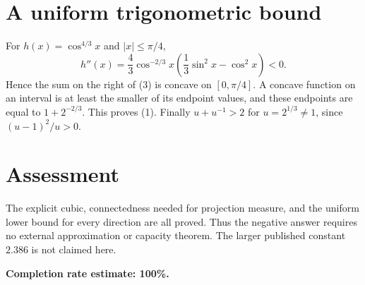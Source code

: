 \documentclass[11pt]{article}
\begin{document}
\section*{A uniform trigonometric bound}
For $h(x)=\cos^{4/3}x$ and $|x|\le\pi/4$,
\[
 h''(x)=\frac43\cos^{-2/3}x
 \left(\frac13\sin^2x-\cos^2x\right)<0.
\]
Hence the sum on the right of (3) is concave on $[0,\pi/4]$. A concave function on an interval is at least the smaller of its endpoint values, and these endpoints are equal to $1+2^{-2/3}$. This proves (1). Finally $u+u^{-1}>2$ for $u=2^{1/3}\ne1$, since $(u-1)^2/u>0$.

\section*{Assessment}
The explicit cubic, connectedness needed for projection measure, and the uniform lower bound for every direction are all proved. Thus the negative answer requires no external approximation or capacity theorem. The larger published constant $2.386$ is not claimed here.

\textbf{Completion rate estimate: 100\%.}
\end{document}
